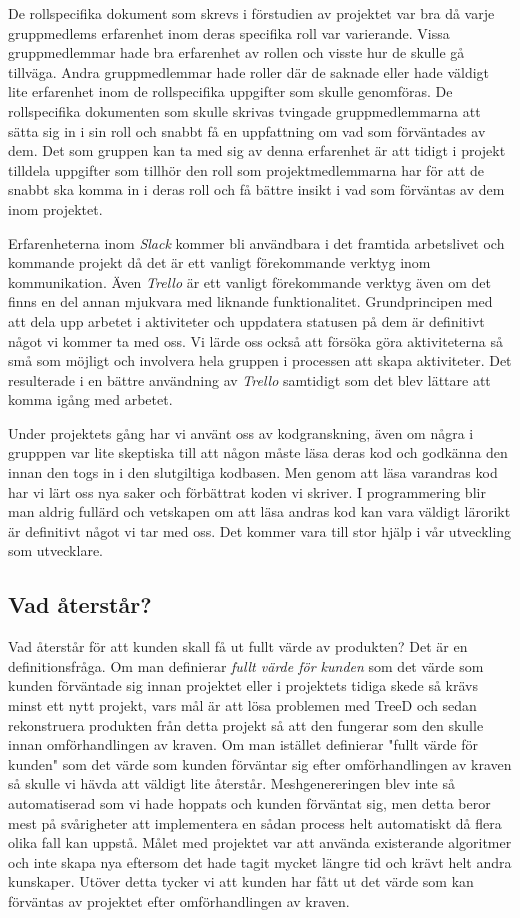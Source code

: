 De rollspecifika dokument som skrevs i förstudien av projektet var bra då varje gruppmedlems erfarenhet inom deras specifika roll var varierande. Vissa gruppmedlemmar hade bra erfarenhet av rollen och visste hur de skulle gå tillväga. Andra gruppmedlemmar hade roller där de saknade eller hade väldigt lite erfarenhet inom de rollspecifika uppgifter som skulle genomföras. De rollspecifika dokumenten som skulle skrivas tvingade gruppmedlemmarna att sätta sig in i sin roll och snabbt få en uppfattning om vad som förväntades av dem. Det som gruppen kan ta med sig av denna erfarenhet är att tidigt i projekt tilldela uppgifter som tillhör den roll som projektmedlemmarna har för att de snabbt ska komma in i deras roll och få bättre insikt i vad som förväntas av dem inom projektet.

Erfarenheterna inom \textit{Slack} kommer bli användbara i det framtida arbetslivet och kommande projekt då det är ett vanligt förekommande verktyg inom kommunikation. Även \textit{Trello} är ett vanligt förekommande verktyg även om det finns en del annan mjukvara med liknande funktionalitet. Grundprincipen med att dela upp arbetet i aktiviteter och uppdatera statusen på dem är definitivt något vi kommer ta med oss. Vi lärde oss också att försöka göra aktiviteterna så små som möjligt och involvera hela gruppen i processen att skapa aktiviteter. Det resulterade i en bättre användning av \textit{Trello} samtidigt som det blev lättare att komma igång med arbetet.

Under projektets gång har vi använt oss av kodgranskning, även om några i grupppen var lite skeptiska till att någon måste läsa deras kod och godkänna den innan den togs in i den slutgiltiga kodbasen. Men genom att läsa varandras kod har vi lärt oss nya saker och förbättrat koden vi skriver. I programmering blir man aldrig fullärd och vetskapen om att läsa andras kod kan vara väldigt lärorikt är definitivt något vi tar med oss. Det kommer vara till stor hjälp i vår utveckling som utvecklare.


\subsection{Vad återstår?}
Vad återstår för att kunden skall få ut fullt värde av produkten? Det är en definitionsfråga. Om man definierar \textit{fullt värde för kunden} som det värde som kunden förväntade sig innan projektet eller i projektets tidiga skede så krävs minst ett nytt projekt, vars mål är att lösa problemen med TreeD och sedan rekonstruera produkten från detta projekt så att den fungerar som den skulle innan omförhandlingen av kraven. Om man istället definierar "fullt värde för kunden" som det värde som kunden förväntar sig efter omförhandlingen av kraven så skulle vi hävda att väldigt lite återstår. Meshgenereringen blev inte så automatiserad som vi hade hoppats och kunden förväntat sig, men detta beror mest på svårigheter att implementera en sådan process helt automatiskt då flera olika fall kan uppstå. Målet med projektet var att använda existerande algoritmer och inte skapa nya eftersom det hade tagit mycket längre tid och krävt helt andra kunskaper. Utöver detta tycker vi att kunden har fått ut det värde som kan förväntas av projektet efter omförhandlingen av kraven.



